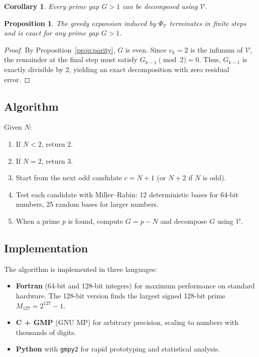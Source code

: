 \documentclass[12pt,a4paper]{article}
\theoremstyle{plain}
\newtheorem{proposition}[theorem]{Proposition}
\newtheorem{corollary}[theorem]{Corollary}
\begin{document}
\begin{corollary}
\label{coro:decomp}
Every prime gap $G>1$ can be decomposed using $\mathcal{V}$.
\end{corollary}

\begin{proposition}
\label{prop:greedy}
The greedy expansion induced by $\Phi_{\mathcal{V}}$ terminates in
finite steps and is exact for any prime gap $G > 1$.
\end{proposition}
\begin{proof}
By Proposition~\ref{prop:parity}, $G$ is even.  Since
$v_k = 2$ is the infimum of $\mathcal{V}$, the remainder at the
final step must satisfy $G_{k-1} \pmod 2 = 0$.  Thus,
$G_{k-1}$ is exactly divisible by $2$, yielding an exact
decomposition with zero residual error.
\end{proof}

\subsection{Algorithm}
\label{sec:algo}

Given $N$:
\begin{enumerate}
  \item If $N<2$, return $2$.
  \item If $N=2$, return $3$.
  \item Start from the next odd candidate $c=N+1$ (or $N+2$ if
    $N$ is odd).
  \item Test each candidate with Miller--Rabin: 12 deterministic
    bases for 64-bit numbers, 25 random bases for larger numbers.
  \item When a prime $p$ is found, compute $G=p-N$ and decompose
    $G$ using $\mathcal{V}$.
\end{enumerate}

\subsection{Implementation}
\label{sec:impl}

The algorithm is implemented in three languages:
\begin{itemize}
  \item {\bf Fortran} (64-bit and 128-bit integers) for maximum
    performance on standard hardware.  The 128-bit version finds
    the largest signed 128-bit prime $M_{127}=2^{127}-1$.
  \item {\bf C + GMP} (GNU MP) for arbitrary precision, scaling
    to numbers with thousands of digits.
  \item {\bf Python} with {\tt gmpy2} for rapid prototyping and
    statistical analysis.
\end{itemize}
\end{document}
